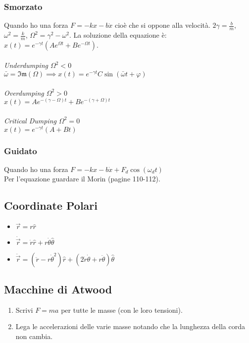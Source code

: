 \documentclass[a4paper,11pt]{article}
\newcommand{\vers}[1]{\hat{#1}}
\begin{document}
\subsubsection*{Smorzato}
Quando ho una forza $F = -kx-b\dot{x}$ cio\`e che si oppone alla velocit\`a. $2\gamma = \frac{b}{m}$, $\omega^2 = \frac{k}{m}$, $\Omega^2 = \gamma^2 - \omega^2$. La soluzione della equazione \`e: $x(t) = e^{-\gamma t} \left(Ae^{\Omega t} + Be^{-\Omega t} \right)$. \\
\\
{\it{Underdumping $\Omega^2 < 0$}} \\
$\bar{\omega} = \mathfrak{Im}(\Omega) \implies x(t) = e^{-\gamma t} C \sin(\bar\omega t + \varphi)$ \\
\\
{\it{Overdumping $\Omega^2 > 0$}} \\
$x(t) = Ae^{-(\gamma - \Omega)t}+Be^{-(\gamma + \Omega)t}$ \\
\\
{\it{Critical Dumping $\Omega^2 = 0$}} \\
$x(t) = e^{-\gamma t} (A + Bt)$ \\

\subsubsection*{Guidato}
Quando ho una forza $F = -kx-b\dot{x}+F_d\cos(\omega_d t)$ \\
Per l'equazione guardare il Morin (pagine 110-112).

\subsection*{Coordinate Polari}
\begin{itemize}
\item $\vec{r} = r \vers{r}$
\item $\dot\vec{r} = \dot{r}\vers{r} + r\dot{\theta}\vers{\theta}$
\item $\ddot\vec{r} = (\ddot{r} - r{\dot\theta}^2)\vers{r} + (2\dot{r}\dot\theta + r\ddot\theta)\vers\theta$
\end{itemize}

\subsection*{Macchine di Atwood}
\begin{enumerate}
\item Scrivi $F = ma$ per tutte le masse (con le loro tensioni).
\item Lega le accelerazioni delle varie masse notando che la lunghezza della corda non cambia.
\end{enumerate}
\end{document}
